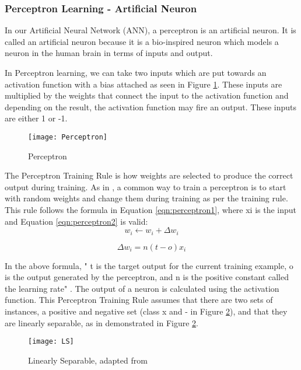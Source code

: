 \tocless\subsubsection{Perceptron Learning - Artificial Neuron}
In our Artificial Neural Network (ANN), a perceptron is an artificial neuron.
It is called an artificial neuron because it is a bio-inspired neuron which models
a neuron in the human brain in terms of inputs and output.

In Perceptron learning, we can take two inputs which are put towards an
activation function with a bias attached as seen in Figure \ref{fig:perceptron}.
These inputs are multiplied by the weights that connect the input to the
activation function and depending on the result, the activation function may
fire an output. These inputs are either 1 or -1.

\begin{figure}[h]
	\centering
     \texttt{[image: Perceptron]}
     \caption{Perceptron}
     \label{fig:perceptron}
\end{figure}

The Perceptron Training Rule is how weights are selected to produce the correct output during training.
As in \parencite{MLANN}, a common way to train a perceptron is to start with random weights and change them during training as per the training rule.
This rule follows the formula in Equation \ref{eqn:perceptron1}, where xi is the input and Equation \ref{eqn:perceptron2} is valid:
\begin{equation}\label{eqn:perceptron1}
    w_{i} \leftarrow w_{i} + \Delta w_{i}
\end{equation}

\begin{equation}\label{eqn:perceptron2}
    \Delta w_{i} = n(t-o)x_{i}
\end{equation}

In the above formula, " t is the target output for the current training example, o is the output generated by the perceptron, and n is the positive constant called the learning rate" \parencite{MLANN}.
The output of a neuron is calculated using the activation function.
This Perceptron Training Rule assumes that there are two sets of instances, a
positive and negative set (class x and - in Figure \ref{fig:ls}), and that they are linearly separable, as in demonstrated in Figure \ref{fig:ls}. 

\begin{figure}[h]
	\centering
    \texttt{[image: LS]}
     \caption{Linearly Separable, adapted from \parencite{MLANN}}
     \label{fig:ls}
\end{figure}

